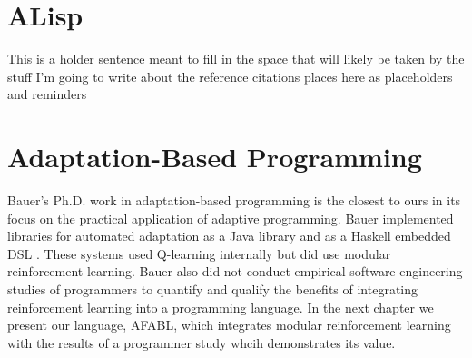 \section{ALisp}


This is a holder sentence meant to fill in the space that will likely be taken by the stuff I'm going to write about the reference citations places here as placeholders and reminders


\section{Adaptation-Based Programming}

Bauer's Ph.D. work in adaptation-based programming \cite{bauer2013adaptation} is the closest to ours in its focus on the practical application of adaptive programming. Bauer implemented libraries for automated adaptation as a Java library \cite{bauer2011adaptation} and as a Haskell embedded DSL \cite{bauer2011adaptation-haskell}. These systems used Q-learning internally but did use modular reinforcement learning. Bauer also did not conduct empirical software engineering studies of programmers to quantify and qualify the benefits of integrating reinforcement learning into a programming language. In the next chapter we present our language, AFABL, which integrates modular reinforcement learning with the results of a programmer study whcih demonstrates its value.
